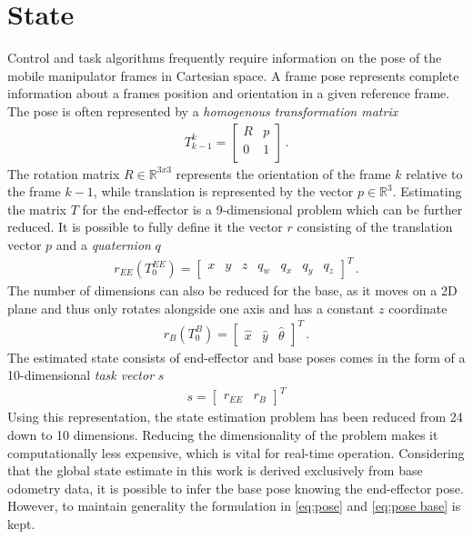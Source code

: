 \documentclass[times, utf8, diplomski, english]{fer}
\begin{document}
\section{State}\label{section:State}
Control and task algorithms frequently require information on the pose of the mobile manipulator frames in Cartesian space. 
A frame pose represents complete information about a frames position and orientation in a given reference frame.
The pose is often represented by a \textit{homogenous transformation matrix}
\begin{align}
T_{k-1}^k =
\begin{bmatrix}
R & p\\
0 & 1\\
\end{bmatrix}\,.
\label{eq:transform}
\end{align}
The rotation matrix $R \in \mathbb{R}^{3x3}$ represents the orientation of the frame $k$ relative to the frame $k-1 $, while translation is represented by the vector $p \in \mathbb{R}^3$.
Estimating the matrix $T$ for the end-effector is a 9-dimensional problem which can be further reduced. 
It is possible to fully define it the vector $r$ consisting of the translation vector $p$ and a \textit{quaternion} $q$
\begin{align} 
r_{EE}\left(T_{0}^{EE}\right) = 
\begin{bmatrix}
x& y& z& q_w& q_x& q_y& q_z
\end{bmatrix}^T\, .
\label{eq:pose}
\end{align}
The number of dimensions can also be reduced for the base, as it moves on a 2D plane and thus only rotates alongside one axis and has a constant $z$ coordinate
\begin{align}\label{eq:pose base}
r_{B}\left(T_{0}^{B}\right) = 
\begin{bmatrix}
\hat{x}& \hat{y}& \hat{\theta}
\end{bmatrix}^T\, .
\end{align}
The estimated state consists of end-effector and base poses comes in the form of a 10-dimensional \textit{task vector} $s$
\begin{align}\label{eq:task_vector}
s = 
\begin{bmatrix}
r_{EE}& r_B
\end{bmatrix}^T
\end{align}
Using this representation, the state estimation problem has been reduced from 24 down to 10 dimensions.
Reducing the dimensionality of the problem makes it computationally less expensive, which is vital for real-time operation.
Considering that the global state estimate in this work is derived exclusively from base odometry data, it is possible to infer the base pose knowing the end-effector pose.
However, to maintain generality the formulation in \eqref{eq:pose} and \eqref{eq:pose base} is kept.
\end{document}
